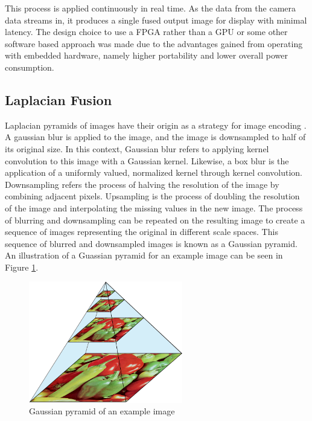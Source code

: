 \documentclass{article}
\begin{document}
This process is applied continuously in real time. As the data from the camera data streams in, it produces a single fused output image for display with minimal latency. The design choice to use a FPGA rather than a GPU or some other software based approach was made due to the advantages gained from operating with embedded hardware, namely higher portability and lower overall power consumption. 

\subsection{Laplacian Fusion}

Laplacian pyramids of images have their origin as a strategy for image encoding \cite{burt_laplacian_1983}. A gaussian blur is applied to the image, and the image is downsampled to half of its original size. In this context, Gaussian blur refers to applying kernel convolution to this image with a Gaussian kernel. Likewise, a box blur is the application of a uniformly valued, normalized kernel through kernel convolution. Downsampling refers the process of halving the resolution of the image by combining adjacent pixels. Upsampling is the process of doubling the resolution of the image and interpolating the missing values in the new image. The process of blurring and downsampling can be repeated on the resulting image to create a sequence of images representing the original in different scale spaces. This sequence of blurred and downsampled images is known as a Gaussian pyramid. An illustration of a Guassian pyramid for an example image can be seen in Figure \ref{fig_pepper_gaussian_pyramid}.

\begin{figure}[h]
	\centering
	\includegraphics[width=0.6\textwidth]{figures/peppers/gaussian_pyramid}
	\caption{Gaussian pyramid of an example image}
	\label{fig_pepper_gaussian_pyramid}
\end{figure}
\end{document}
